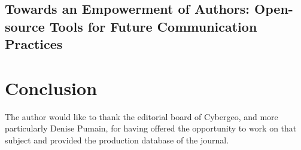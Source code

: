 \subsection*{Towards an Empowerment of Authors: Open-source Tools for Future Communication Practices}











\section*{Conclusion}
\label{sec:discussion}







\begin{acknowledgements}
The author would like to thank the editorial board of Cybergeo, and more particularly Denise Pumain, for having offered the opportunity to work on that subject and provided the production database of the journal. 
\end{acknowledgements}






















